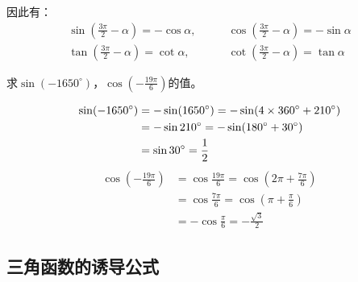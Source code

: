 因此有：
\begin{equation}
    \begin{split}
        \sin\left(\frac{3\pi}{2}-\alpha\right)=-\cos\alpha, &\qquad \cos\left(\frac{3\pi}{2}-\alpha\right)=-\sin\alpha \\
        \tan\left(\frac{3\pi}{2}-\alpha\right)=\cot\alpha, &\qquad \cot\left(\frac{3\pi}{2}-\alpha\right)=\tan\alpha 
    \end{split}    
    \end{equation}

\begin{example}
求$\sin(-1650^{\circ})$，$\cos\left(-\frac{19\pi}{6}\right)$的值。
\end{example}

\begin{solution}
\[\begin{split}
    \sin(-1650^{\circ})&=-\sin(1650^{\circ})=-\sin(4\times360^{\circ}+210^{\circ})\\
    &=-\sin 210^{\circ}=-\sin(180^{\circ}+30^{\circ})\\
    &=\sin30^{\circ}=\dfrac{1}{2}
\end{split}\]
\[\begin{split}
    \cos\left(-\frac{19\pi}{6}\right)&=\cos\frac{19\pi}{6}=\cos\left(2\pi+\frac{7\pi}{6}\right)\\
    &=\cos\frac{7\pi}{6}=\cos\left(\pi+\frac{\pi}{6}\right)\\
    &=-\cos\frac{\pi}{6}=-\frac{\sqrt{3}}{2}
\end{split}\]
\end{solution}

\subsection{三角函数的诱导公式}

